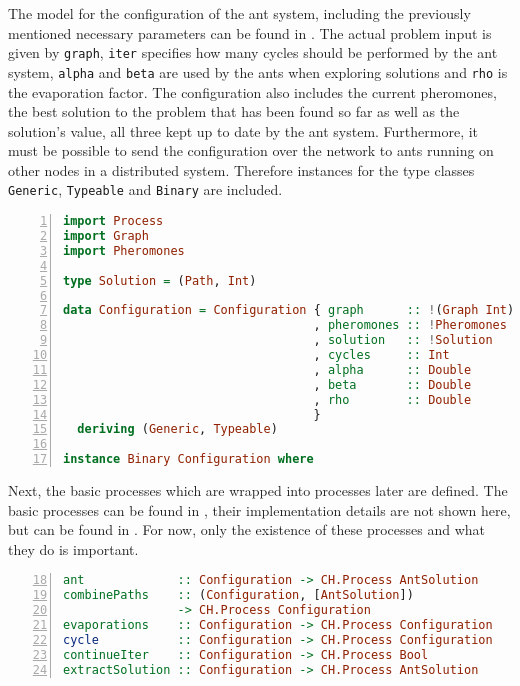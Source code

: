 The model for the configuration of the ant system, including the previously mentioned necessary parameters can be found in . The actual problem input is given by \texttt{graph}, \texttt{iter} specifies how many cycles should be performed by the ant system, \texttt{alpha} and \texttt{beta} are used by the ants when exploring solutions and \texttt{rho} is the evaporation factor. The configuration also includes the current pheromones, the best solution to the problem that has been found so far as well as the solution's value, all three kept up to date by the ant system. Furthermore, it must be possible to send the configuration over the network to ants running on other nodes in a distributed system. Therefore instances for the type classes \texttt{Generic}, \texttt{Typeable} and \texttt{Binary} are included.

\begin{lstlisting}[language=Haskell,frame=tb,numbers=left,label=lst:ant_conf,caption=Imports and configuration for the ant system., basicstyle=\footnotesize\ttfamily]
import Process
import Graph
import Pheromones

type Solution = (Path, Int)

data Configuration = Configuration { graph      :: !(Graph Int)
                                   , pheromones :: !Pheromones
                                   , solution   :: !Solution
                                   , cycles     :: Int
                                   , alpha      :: Double
                                   , beta       :: Double
                                   , rho        :: Double
                                   }
  deriving (Generic, Typeable)

instance Binary Configuration where
\end{lstlisting}

Next, the basic processes which are wrapped into processes later are defined. The basic processes can be found in , their implementation details are not shown here, but can be found in . For now, only the existence of these processes and what they do is important.

\begin{lstlisting}[language=Haskell,frame=tb,numbers=left,label=lst:ant_basic,caption=Signatures of basic processes.,firstnumber=18]
ant             :: Configuration -> CH.Process AntSolution
combinePaths    :: (Configuration, [AntSolution])
                -> CH.Process Configuration
evaporations    :: Configuration -> CH.Process Configuration
cycle           :: Configuration -> CH.Process Configuration
continueIter    :: Configuration -> CH.Process Bool
extractSolution :: Configuration -> CH.Process AntSolution
\end{lstlisting}

